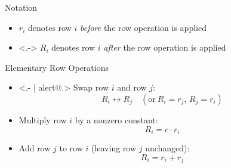\documentclass{beamer}
\begin{document}
\begin{frame}
\begin{block}{Notation} 
\begin{itemize}
\item<+-> $r_i$ denotes row $i$ \emph{before} the row operation is applied
\item<.-> $R_i$ denotes row $i$ \emph{after} the row operation is applied
\end{itemize}
\end{block}
\onslide<+->
\begin{block}{Elementary Row Operations} 
\begin{itemize}
\item<.- | alert@.> Swap row $i$ and row $j$:
\begin{equation*}
R_i\leftrightarrow R_j \quad\left(\text{or}\ R_i=r_j\text{, } R_j=r_i\right)
\end{equation*}
\item<+- | alert@+> Multiply row $i$ by a nonzero constant:
\begin{equation*}
R_i=c\cdot r_i
\end{equation*}
\item<+- | alert@+> Add row $j$ to row $i$ (leaving row $j$ unchanged):
\begin{equation*}
R_i=r_i+r_j
\end{equation*}
\end{itemize}
\end{block}
\end{frame}
\end{document}

